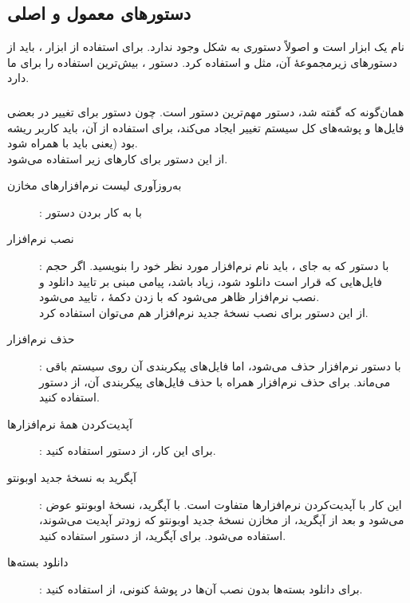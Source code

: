 \subsection[دستورهای معمول و اصلی Apt]{دستورهای معمول و اصلی }
 نام یک ابزار است و اصولاً دستوری به شکل  وجود ندارد. برای استفاده از ابزار ، باید از دستورهای زیرمجموعهٔ آن، مثل  و  استفاده کرد. دستور ، بیش‌ترین استفاده را برای ما دارد.

\subsubsection[apt-get]{}
همان‌گونه که گفته شد، دستور  مهم‌ترین دستور است. چون دستور برای تغییر در بعضی فایل‌ها و پوشه‌های کل سیستم تغییر ایجاد می‌کند، برای استفاده از آن، باید کاربر ریشه بود (یعنی باید با  همراه شود.\\
از این دستور برای کارهای زیر استفاده می‌شود.

\begin{description}
\item [به‌روزآوری لیست نرم‌افزارهای مخازن]: با به کار بردن دستور 
\item [نصب نرم‌افزار]: با دستور  که به جای ، باید نام نرم‌افزار مورد نظر خود را بنویسید. اگر حجم فایل‌هایی که قرار است دانلود شود، زیاد باشد، پیامی مبنی بر تایید دانلود و نصب نرم‌افزار ظاهر می‌شود که با زدن دکمهٔ ، تایید می‌شود.\\
از این دستور برای نصب نسخهٔ جدید نرم‌افزار هم می‌توان استفاده کرد.
\item [حذف نرم‌افزار]: با دستور  نرم‌افزار حذف می‌شود، اما فایل‌های پیکربندی آن روی سیستم باقی می‌ماند. برای حذف نرم‌افزار همراه با حذف فایل‌های پیکربندی آن، از دستور  استفاده کنید.
\item [آپدیت‌کردن همهٔ نرم‌افزارها]: برای این کار، از دستور  استفاده کنید.
\item [آپگرید به نسخهٔ جدید اوبونتو]: این کار با آپدیت‌کردن نرم‌افزارها متفاوت است. با آپگرید، نسخهٔ اوبونتو عوض می‌شود و بعد از آپگرید، از مخازن نسخهٔ جدید اوبونتو که زودتر آپدیت می‌شوند، استفاده می‌شود. برای آپگرید، از دستور  استفاده کنید.
\item [دانلود بسته‌ها]: برای دانلود بسته‌ها بدون نصب آن‌ها در پوشهٔ کنونی، از  استفاده کنید.
\end{description}

